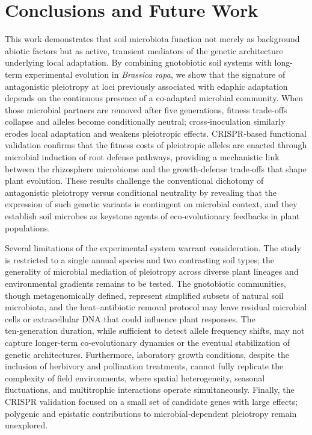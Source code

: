 \documentclass{article}
\begin{document}
\section{Conclusions and Future Work}

This work demonstrates that soil microbiota function not merely as background abiotic factors but as active, transient mediators of the genetic architecture underlying local adaptation. By combining gnotobiotic soil systems with long-term experimental evolution in \textit{Brassica rapa}, we show that the signature of antagonistic pleiotropy at loci previously associated with edaphic adaptation depends on the continuous presence of a co‑adapted microbial community. When those microbial partners are removed after five generations, fitness trade‑offs collapse and alleles become conditionally neutral; cross‑inoculation similarly erodes local adaptation and weakens pleiotropic effects. CRISPR‑based functional validation confirms that the fitness costs of pleiotropic alleles are enacted through microbial induction of root defense pathways, providing a mechanistic link between the rhizosphere microbiome and the growth‑defense trade‑offs that shape plant evolution. These results challenge the conventional dichotomy of antagonistic pleiotropy versus conditional neutrality by revealing that the expression of such genetic variants is contingent on microbial context, and they establish soil microbes as keystone agents of eco‑evolutionary feedbacks in plant populations.

Several limitations of the experimental system warrant consideration. The study is restricted to a single annual species and two contrasting soil types; the generality of microbial mediation of pleiotropy across diverse plant lineages and environmental gradients remains to be tested. The gnotobiotic communities, though metagenomically defined, represent simplified subsets of natural soil microbiota, and the heat–antibiotic removal protocol may leave residual microbial cells or extracellular DNA that could influence plant responses. The ten‑generation duration, while sufficient to detect allele frequency shifts, may not capture longer‑term co‑evolutionary dynamics or the eventual stabilization of genetic architectures. Furthermore, laboratory growth conditions, despite the inclusion of herbivory and pollination treatments, cannot fully replicate the complexity of field environments, where spatial heterogeneity, seasonal fluctuations, and multitrophic interactions operate simultaneously. Finally, the CRISPR validation focused on a small set of candidate genes with large effects; polygenic and epistatic contributions to microbial‑dependent pleiotropy remain unexplored.
\end{document}

